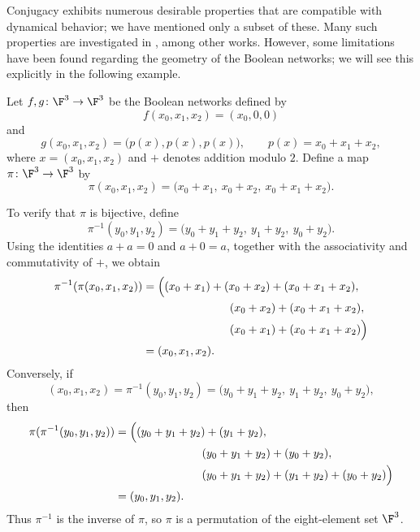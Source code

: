 Conjugacy exhibits numerous desirable properties that are compatible with dynamical behavior; we have mentioned only a subset of these. Many such properties are investigated in \cite{laubenbacher2001equivalence,laubenbacher2003decomposition,reidys2005certain,kadelka2023modularity}, among other works. However, some limitations have been found regarding the geometry of the Boolean networks; we will see this explicitly in the following example.

\begin{example}\label{picard}

    Let $f,g\colon\F^3\to\F^3$ be the Boolean networks defined by
    \[
        f(x_0,x_1,x_2)=(x_0,0,0)
    \]
    and
    \[
        g(x_0,x_1,x_2)=\bigl(p(x),p(x),p(x)\bigr),
        \qquad
        p(x)=x_0+ x_1+ x_2,
    \]
    where $x=(x_0,x_1,x_2)$ and $+$ denotes addition modulo $2$. Define a map $\pi\colon\F^3\to\F^3$ by
    \[
        \pi(x_0,x_1,x_2)
        =\bigl(x_0+ x_1,\ x_0+ x_2,\ x_0+ x_1+ x_2\bigr).
    \]

    \medskip

    To verify that $\pi$ is bijective, define
    \[
        \pi^{-1}(y_0,y_1,y_2)
        =\bigl(y_0+ y_1+ y_2,\ y_1+ y_2,\ y_0+ y_2\bigr).
    \]
    Using the identities $a+ a=0$ and $a+0=a$, together with the associativity and commutativity of $+$, we obtain
    \begin{align*}
        \pi^{-1}(\pi(x_0,x_1,x_2))
        & =\Bigl(
        (x_0+ x_1)+(x_0+ x_2)+(x_0+ x_1+ x_2),\\
        &\hspace{2.7cm}(x_0+ x_2)+(x_0+ x_1+ x_2),\\
        &\hspace{2.7cm}(x_0+ x_1)+(x_0+ x_1+ x_2)
        \Bigr)\\
        & =(x_0,x_1,x_2).
    \end{align*}
    Conversely, if
    \[
        (x_0,x_1,x_2)
        =\pi^{-1}(y_0,y_1,y_2)
        =\bigl(y_0+ y_1+ y_2,\ y_1+ y_2,\ y_0+ y_2\bigr),
    \]
    then
    \begin{align*}
        \pi(\pi^{-1}(y_0,y_1,y_2))
        & =\Bigl(
        (y_0+ y_1+ y_2)+(y_1+ y_2),\\
        &\hspace{2.7cm}(y_0+ y_1+ y_2)+(y_0+ y_2),\\
        &\hspace{2.7cm}(y_0+ y_1+ y_2)+(y_1+ y_2)+(y_0+ y_2)
        \Bigr)\\
        & =(y_0,y_1,y_2).
    \end{align*}
    Thus $\pi^{-1}$ is the inverse of $\pi$, so $\pi$ is a permutation of the eight-element set $\F^3$.


\end{example}
